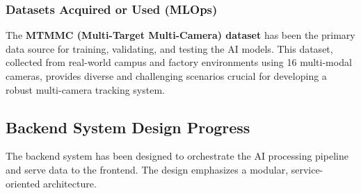 \subsubsection*{Datasets Acquired or Used (MLOps)}
The \textbf{MTMMC (Multi-Target Multi-Camera) dataset} has been the primary data source for training, validating, and testing the AI models. This dataset, collected from real-world campus and factory environments using 16 multi-modal cameras, provides diverse and challenging scenarios crucial for developing a robust multi-camera tracking system.

\subsection*{Backend System Design Progress}
\label{subsec:progress_backend}
The backend system has been designed to orchestrate the AI processing pipeline and serve data to the frontend. The design emphasizes a modular, service-oriented architecture.

